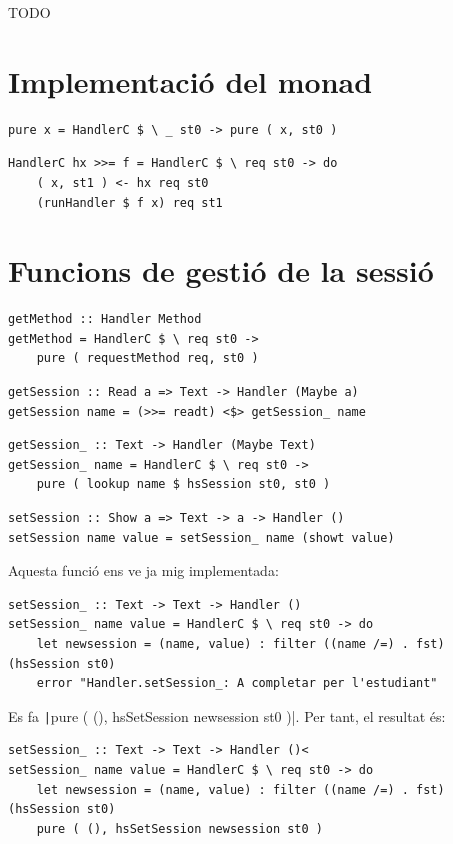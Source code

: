 \documentclass[catalan, a4paper]{scrartcl}
\begin{document}
TODO

\section{Implementació del monad}

\begin{verbatim}
pure x = HandlerC $ \ _ st0 -> pure ( x, st0 )
\end{verbatim}

\begin{verbatim}
HandlerC hx >>= f = HandlerC $ \ req st0 -> do
    ( x, st1 ) <- hx req st0
    (runHandler $ f x) req st1
\end{verbatim}

\section{Funcions de gestió de la sessió}

\begin{verbatim}
getMethod :: Handler Method
getMethod = HandlerC $ \ req st0 ->
    pure ( requestMethod req, st0 )  
\end{verbatim}

\begin{verbatim}
getSession :: Read a => Text -> Handler (Maybe a)
getSession name = (>>= readt) <$> getSession_ name
\end{verbatim}

\begin{verbatim}
getSession_ :: Text -> Handler (Maybe Text)
getSession_ name = HandlerC $ \ req st0 ->
    pure ( lookup name $ hsSession st0, st0 )
\end{verbatim}

\begin{verbatim}
setSession :: Show a => Text -> a -> Handler ()
setSession name value = setSession_ name (showt value)
\end{verbatim}

Aquesta funció ens ve ja mig implementada:

\begin{verbatim}
setSession_ :: Text -> Text -> Handler ()
setSession_ name value = HandlerC $ \ req st0 -> do
    let newsession = (name, value) : filter ((name /=) . fst) (hsSession st0)
    error "Handler.setSession_: A completar per l'estudiant"
\end{verbatim}

Es fa \texttt|pure ( (), hsSetSession newsession st0 )|.
Per tant, el resultat és:

\begin{verbatim}
setSession_ :: Text -> Text -> Handler ()<
setSession_ name value = HandlerC $ \ req st0 -> do
    let newsession = (name, value) : filter ((name /=) . fst) (hsSession st0)
    pure ( (), hsSetSession newsession st0 )
\end{verbatim}
\end{document}
